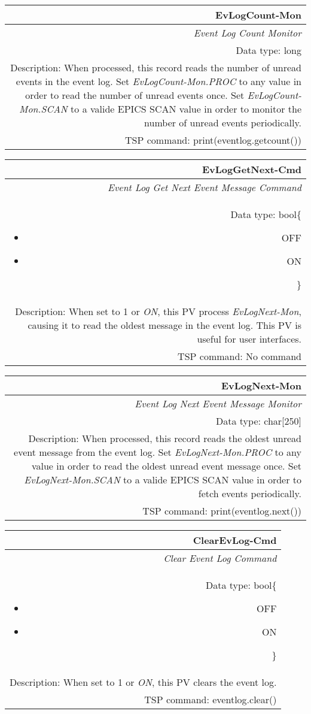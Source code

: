 \documentclass[openany]{article}
\begin{document}
		\begin{tabular}{N}
			\hline
			\bfseries EvLogCount-Mon\label{pv:evlogcount-mon} \\ \hline
			\emph{Event Log Count Monitor} \\
			Data type: long \\
			Description: When processed, this record reads the number of unread events in the event log. Set \emph{EvLogCount-Mon.PROC} to any value in order to read the number of unread events once. Set \emph{EvLogCount-Mon.SCAN} to a valide EPICS SCAN value in order to monitor the number of unread events periodically. \\
			TSP command: print(eventlog.getcount())
		\end{tabular}

		\begin{tabular}{N}
			\hline
			\bfseries EvLogGetNext-Cmd\label{pv:evloggetnext-mon} \\ \hline
			\emph{Event Log Get Next Event Message Command} \\
			Data type: bool\{\begin{itemize}[noitemsep]
				\small
				\item[] OFF
				\item[] ON
			\end{itemize}\} \\
			Description: When set to 1 or \emph{ON}, this PV process \emph{EvLogNext-Mon}, causing it to read the oldest message in the event log. This PV is useful for user interfaces. \\
			TSP command: No command
		\end{tabular}

		\begin{tabular}{N}
			\hline
			\bfseries EvLogNext-Mon\label{pv:evlognext-mon} \\ \hline
			\emph{Event Log Next Event Message Monitor} \\
			Data type: char[250] \\
			Description: When processed, this record reads the oldest unread event message from the event log. Set \emph{EvLogNext-Mon.PROC} to any value in order to read the oldest unread event message once. Set \emph{EvLogNext-Mon.SCAN} to a valide EPICS SCAN value in order to fetch events periodically. \\
			TSP command: print(eventlog.next())
		\end{tabular}

		\begin{tabular}{N}
			\hline
			\bfseries ClearEvLog-Cmd\label{pv:clearevlog-cmd} \\ \hline
			\emph{Clear Event Log Command} \\
			Data type: bool\{\begin{itemize}[noitemsep]
				\small
				\item[] OFF
				\item[] ON
			\end{itemize}\} \\
			Description: When set to 1 or \emph{ON}, this PV clears the event log. \\
			TSP command: eventlog.clear()
		\end{tabular}
\end{document}

